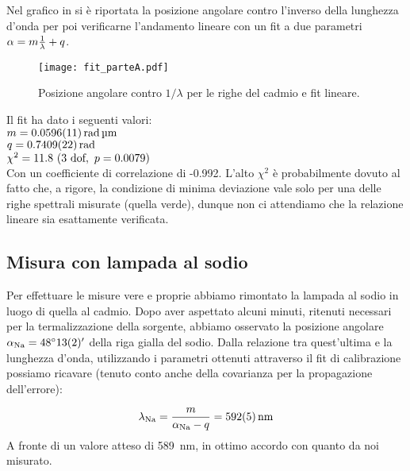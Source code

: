 	Nel grafico in  si è riportata la posizione angolare contro l'inverso della
	lunghezza d'onda per poi verificarne l'andamento lineare con un fit a
	due parametri $\alpha = m \frac{1}{\lambda} + q $.

	\begin{figure} [h]
		\centering
		\texttt{[image: fit\_parteA.pdf]}
		\caption{Posizione angolare contro $1/\lambda$ per le righe del cadmio e fit lineare.}
		\label{fig:fit_a}
	\end{figure}

	Il fit ha dato i seguenti valori: \\
	$m = \SI{0.0596 \pm 0.0011}{\radian\um}$ \\
	$q = \SI{0.7409 \pm 0.0022}{\radian}$ \\
	$\chi^2 = 11.8 \ (3 \text{ dof} , \  p = 0.0079) $ \\
	Con un coefficiente di correlazione di -0.992. L'alto $\chi^2$ è probabilmente
	dovuto al fatto che, a rigore, la condizione di minima deviazione vale solo
	per una delle righe spettrali misurate (quella verde), dunque non ci attendiamo
	che la relazione lineare sia esattamente verificata.

\subsection{Misura con lampada al sodio}
	Per effettuare le misure vere e proprie abbiamo
	rimontato la lampada al sodio in luogo di quella al cadmio.
	Dopo aver aspettato alcuni minuti, ritenuti necessari per la
	termalizzazione della sorgente, abbiamo osservato la posizione angolare
	$\alpha_{\text{Na}} = \angerr{48}{13(2)}$ della riga gialla del sodio.
	Dalla relazione tra quest'ultima e la lunghezza d'onda, utilizzando i parametri
	ottenuti attraverso il fit di calibrazione possiamo ricavare (tenuto conto
	anche della covarianza per la propagazione dell'errore):

	\begin{equation}
		\lambda_{\text{Na}} = \frac{m}{\alpha_{\text{Na}} - q} = \SI{592 (5)}{\nm}
	\end{equation}
	A fronte di un valore atteso di \SI{589}{\nm}, in ottimo accordo con quanto da noi misurato.
